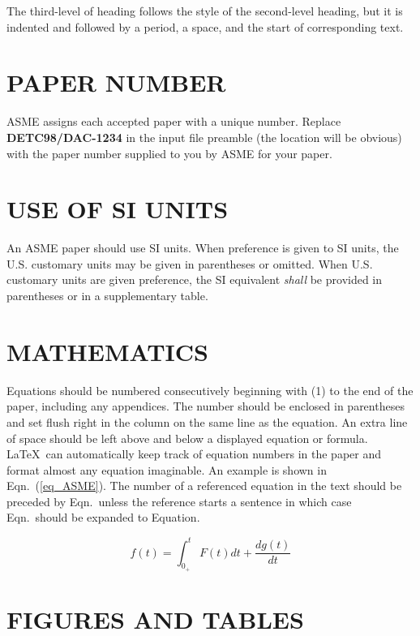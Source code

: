 \documentclass[twocolumn,10pt]{asme2e}
\begin{document}
{The third-level of heading follows the style of the second-level heading, but it is indented and followed by a period, a space, and the start of corresponding text.

\section*{PAPER NUMBER}

ASME assigns each accepted paper with a unique number. Replace {\bf DETC98/DAC-1234} in the input file preamble (the location will be obvious) with the paper number supplied to you  by ASME for your paper.


\section*{USE OF SI UNITS}

An ASME paper should use SI units.  When preference is given to SI units, the U.S. customary units may be given in parentheses or omitted. When U.S. customary units are given preference, the SI equivalent {\em shall} be provided in parentheses or in a supplementary table. 
\section*{MATHEMATICS}

Equations should be numbered consecutively beginning with (1) to the end of the paper, including any appendices.  The number should be enclosed in parentheses and set flush right in the column on the same line as the equation.  An extra line of space should be left above and below a displayed equation or formula. \LaTeX\ can automatically keep track of equation numbers in the paper and format almost any equation imaginable. An example is shown in Eqn.~(\ref{eq_ASME}). The number of a referenced equation in the text should be preceded by Eqn.\ unless the reference starts a sentence in which case Eqn.\ should be expanded to Equation.

\begin{equation}
f(t) = \int_{0_+}^t F(t) dt + \frac{d g(t)}{d t}
\label{eq_ASME}
\end{equation}

\section*{FIGURES AND TABLES}

}
\end{document}

